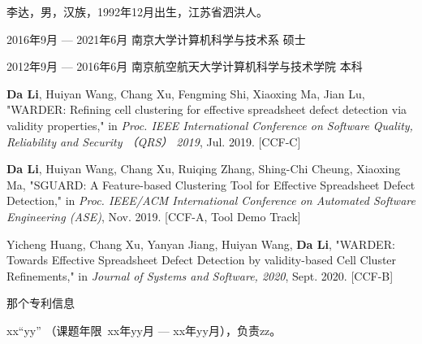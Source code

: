 \begin{resume}
  \begin{authorinfo}
  \noindent 李达，男，汉族，1992年12月出生，江苏省泗洪人。
  \end{authorinfo}
  \begin{education}
  \item[2016年9月 --- 2021年6月] 南京大学计算机科学与技术系 \hfill 硕士
  \item[2012年9月 --- 2016年6月] 南京航空航天大学计算机科学与技术学院 \hfill 本科
  \end{education}
  \begin{publications}
    \item \textbf{Da Li}, Huiyan Wang, Chang Xu, Fengming Shi, Xiaoxing Ma, Jian Lu, "WARDER: Refining cell clustering for effective spreadsheet defect detection via validity properties," in \textsl{Proc. IEEE International Conference on Software Quality, Reliability and Security （QRS） 2019}, Jul. 2019. [CCF-C]
    \item \textbf{Da Li}, Huiyan Wang, Chang Xu, Ruiqing Zhang, Shing-Chi Cheung, Xiaoxing Ma, "SGUARD: A Feature-based Clustering Tool for Effective Spreadsheet Defect Detection," in \textsl{Proc. IEEE/ACM International Conference on Automated Software Engineering (ASE)}, Nov. 2019. [CCF-A, Tool Demo Track]
    \item Yicheng Huang, Chang Xu, Yanyan Jiang, Huiyan Wang, \textbf{Da Li}, "WARDER: Towards Effective Spreadsheet Defect Detection by validity-based Cell Cluster Refinements," in \textsl{Journal of Systems and Software, 2020}, Sept. 2020. [CCF-B]
    \item 那个专利信息
  
  \end{publications}
  \begin{projects}
  \item xx``yy''
  （课题年限~xx年yy月 --- xx年yy月），负责zz。
  \end{projects}
 \end{resume}

